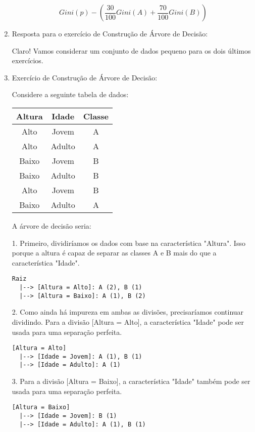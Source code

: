 \documentclass[12pt,a4paper, brazil]{article}
\begin{document}
\begin{enumerate}
$$
Gini(p) - \left(\frac{30}{100} Gini(A) + \frac{70}{100} Gini(B)\right)
$$

\item Resposta para o exercício de Construção de Árvore de Decisão:

Claro! Vamos considerar um conjunto de dados pequeno para os dois últimos exercícios.

\item Exercício de Construção de Árvore de Decisão:

Considere a seguinte tabela de dados:

\begin{center}
\begin{tabular}{ |c|c|c| } 
 \hline
 Altura & Idade & Classe \\ 
 \hline
 Alto & Jovem & A \\ 
 Alto & Adulto & A \\ 
 Baixo & Jovem & B \\ 
 Baixo & Adulto & B \\ 
 Alto & Jovem & B \\ 
 Baixo & Adulto & A \\ 
 \hline
\end{tabular}
\end{center}

A árvore de decisão seria:

1. Primeiro, dividiríamos os dados com base na característica "Altura". Isso porque a altura é capaz de separar as classes A e B mais do que a característica "Idade".

\begin{verbatim}
Raiz
  |--> [Altura = Alto]: A (2), B (1)
  |--> [Altura = Baixo]: A (1), B (2)
\end{verbatim}

2. Como ainda há impureza em ambas as divisões, precisaríamos continuar dividindo. Para a divisão [Altura = Alto], a característica "Idade" pode ser usada para uma separação perfeita.

\begin{verbatim}
[Altura = Alto]
  |--> [Idade = Jovem]: A (1), B (1)
  |--> [Idade = Adulto]: A (1)
\end{verbatim}

3. Para a divisão [Altura = Baixo], a característica "Idade" também pode ser usada para uma separação perfeita.

\begin{verbatim}
[Altura = Baixo]
  |--> [Idade = Jovem]: B (1)
  |--> [Idade = Adulto]: A (1), B (1)
\end{verbatim}


\end{enumerate}
\end{document}
